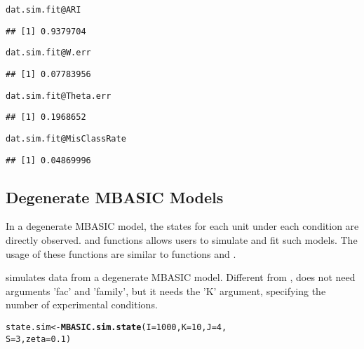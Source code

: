 \documentclass[a4paper,10pt]{article}\usepackage[]{graphicx}\usepackage[]{color}
\makeatletter
\newcommand{\hlnum}[1]{\textcolor[rgb]{0.686,0.059,0.569}{#1}}%
\newcommand{\hlopt}[1]{\textcolor[rgb]{0,0,0}{#1}}%
\newcommand{\hlstd}[1]{\textcolor[rgb]{0.345,0.345,0.345}{#1}}%
\newcommand{\hlkwb}[1]{\textcolor[rgb]{0.69,0.353,0.396}{#1}}%
\newcommand{\hlkwc}[1]{\textcolor[rgb]{0.333,0.667,0.333}{#1}}%
\newcommand{\hlkwd}[1]{\textcolor[rgb]{0.737,0.353,0.396}{\textbf{#1}}}%
\newenvironment{kframe}{%
 \def\at@end@of@kframe{}%
 \ifinner\ifhmode%
  \def\at@end@of@kframe{\end{minipage}}%
  \begin{minipage}{\columnwidth}%
 \fi\fi%
 \def\FrameCommand##1{\hskip\@totalleftmargin \hskip-\fboxsep
 \colorbox{shadecolor}{##1}\hskip-\fboxsep
     \hskip-\linewidth \hskip-\@totalleftmargin \hskip\columnwidth}%
 \MakeFramed {\advance\hsize-\width
   \@totalleftmargin\z@ \linewidth\hsize
   \@setminipage}}%
 {\par\unskip\endMakeFramed%
 \at@end@of@kframe}
\newenvironment{knitrout}{}{} %
\makeatother
\begin{document}
\begin{knitrout}
\color{fgcolor}\begin{kframe}
\begin{alltt}
\hlstd{dat.sim.fit}\hlopt{@}\hlkwc{ARI}
\end{alltt}
\begin{verbatim}
## [1] 0.9379704
\end{verbatim}
\begin{alltt}
\hlstd{dat.sim.fit}\hlopt{@}\hlkwc{W.err}
\end{alltt}
\begin{verbatim}
## [1] 0.07783956
\end{verbatim}
\begin{alltt}
\hlstd{dat.sim.fit}\hlopt{@}\hlkwc{Theta.err}
\end{alltt}
\begin{verbatim}
## [1] 0.1968652
\end{verbatim}
\begin{alltt}
\hlstd{dat.sim.fit}\hlopt{@}\hlkwc{MisClassRate}
\end{alltt}
\begin{verbatim}
## [1] 0.04869996
\end{verbatim}
\end{kframe}
\end{knitrout}

\subsection{Degenerate MBASIC Models}

In a degenerate MBASIC model, the states for each unit under each condition are directly observed.  and  functions allows users to simulate and fit such models. The usage of these functions are similar to functions  and .

 simulates data from a degenerate MBASIC model. Different from ,  does not need arguments 'fac' and 'family', but it needs the 'K' argument, specifying the number of experimental conditions.

\begin{knitrout}
\color{fgcolor}\begin{kframe}
\begin{alltt}
\hlstd{state.sim} \hlkwb{<-} \hlkwd{MBASIC.sim.state}\hlstd{(}\hlkwc{I} \hlstd{=} \hlnum{1000}\hlstd{,} \hlkwc{K} \hlstd{=} \hlnum{10}\hlstd{,} \hlkwc{J} \hlstd{=} \hlnum{4}\hlstd{,}
    \hlkwc{S} \hlstd{=} \hlnum{3}\hlstd{,} \hlkwc{zeta} \hlstd{=} \hlnum{0.1}\hlstd{)}
\end{alltt}
\end{kframe}
\end{knitrout}
\end{document}

